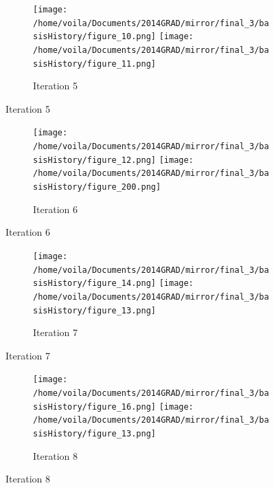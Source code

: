 \begin{figure}\ContinuedFloat
\begin{center}
    \begin{subfigure}[t]{1.\textwidth}     
        \centering
        \texttt{[image: /home/voila/Documents/2014GRAD/mirror/final\_3/basisHistory/figure\_10.png]}
        \texttt{[image: /home/voila/Documents/2014GRAD/mirror/final\_3/basisHistory/figure\_11.png]}
        \caption{Iteration 5}
        \label{fig: basis history 5}
    \end{subfigure}
\end{center}
\end{figure}
\begin{figure}\ContinuedFloat
\begin{center}
    \begin{subfigure}[t]{1.\textwidth}
        \centering
        \texttt{[image: /home/voila/Documents/2014GRAD/mirror/final\_3/basisHistory/figure\_12.png]}
        \texttt{[image: /home/voila/Documents/2014GRAD/mirror/final\_3/basisHistory/figure\_200.png]}
        \caption{Iteration 6}
        \label{fig: basis history 7}
    \end{subfigure}
\end{center}
\end{figure}
\begin{figure}\ContinuedFloat
\begin{center}
    \begin{subfigure}[t]{1.\textwidth}     
        \centering
        \texttt{[image: /home/voila/Documents/2014GRAD/mirror/final\_3/basisHistory/figure\_14.png]}
        \texttt{[image: /home/voila/Documents/2014GRAD/mirror/final\_3/basisHistory/figure\_13.png]}
        \caption{Iteration 7}
        \label{fig: basis history 8}
    \end{subfigure}
\end{center}
\end{figure}
\begin{figure}\ContinuedFloat
\begin{center}
    \begin{subfigure}[t]{1.\textwidth}
        \centering
        \texttt{[image: /home/voila/Documents/2014GRAD/mirror/final\_3/basisHistory/figure\_16.png]}
        \texttt{[image: /home/voila/Documents/2014GRAD/mirror/final\_3/basisHistory/figure\_13.png]}
        \caption{Iteration 8}
        \label{fig: basis history 6}
    \end{subfigure}
\end{center}
\end{figure}

